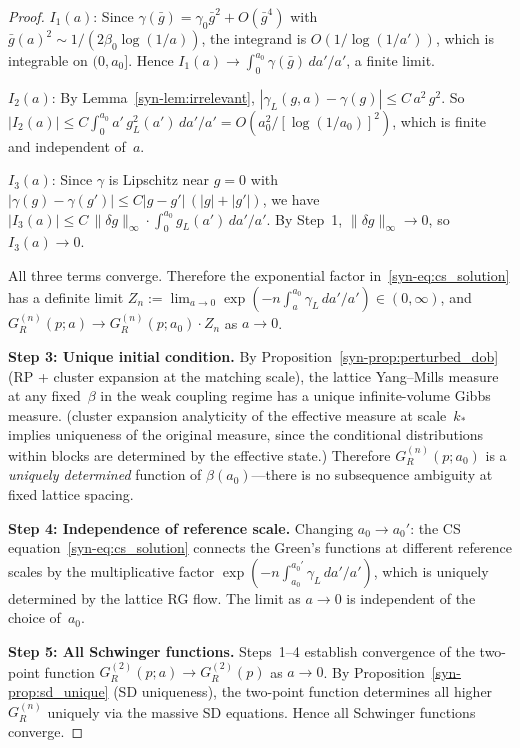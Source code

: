 \documentclass[11pt]{article}
\theoremstyle{definition}
\begin{document}
\begin{proof}
\noindent$I_1(a)$: Since
$\gamma(\bar{g}) = \gamma_0 \bar{g}^2 + O(\bar{g}^4)$
with $\bar{g}(a)^2 \sim 1/(2\beta_0\log(1/a))$,
the integrand is $O(1/\log(1/a'))$, which is integrable
on $(0, a_0]$.  Hence $I_1(a) \to
\int_0^{a_0} \gamma(\bar{g})\,da'/a'$, a finite limit.

\noindent$I_2(a)$: By Lemma~\ref{syn-lem:irrelevant},
$|\gamma_L(g,a) - \gamma(g)| \leq C\,a^2\,g^2$.
So $|I_2(a)| \leq C \int_0^{a_0}
a'\,g_L^2(a')\,da'/a' = O(a_0^2/[\log(1/a_0)]^2)$,
which is finite and independent of~$a$.

\noindent$I_3(a)$: Since $\gamma$ is Lipschitz near $g = 0$
with $|\gamma(g) - \gamma(g')| \leq C|g - g'|\,(|g| + |g'|)$,
we have $|I_3(a)| \leq C\,\|\delta g\|_\infty \cdot
\int_0^{a_0} g_L(a')\,da'/a'$.  By Step~1,
$\|\delta g\|_\infty \to 0$, so $I_3(a) \to 0$.

All three terms converge.  Therefore the exponential
factor in~\eqref{syn-eq:cs_solution} has a definite limit
$Z_n := \lim_{a \to 0} \exp(-n\int_a^{a_0}\gamma_L\,da'/a')
\in (0,\infty)$,
and $G_R^{(n)}(p; a) \to G_R^{(n)}(p; a_0) \cdot Z_n$
as $a \to 0$.

\smallskip
\textbf{Step 3: Unique initial condition.}
By Proposition~\ref{syn-prop:perturbed_dob} (RP + cluster expansion
at the matching scale), the lattice Yang--Mills
measure at any fixed~$\beta$ in the weak coupling regime
has a unique infinite-volume Gibbs measure.
(cluster expansion analyticity of the effective measure at
scale~$k_*$ implies uniqueness of the original
measure, since the conditional distributions within
blocks are determined by the effective state.)
Therefore $G_R^{(n)}(p; a_0)$ is a \emph{uniquely determined}
function of $\beta(a_0)$---there is no subsequence ambiguity
at fixed lattice spacing.

\smallskip
\textbf{Step 4: Independence of reference scale.}
Changing $a_0 \to a_0'$: the CS
equation~\eqref{syn-eq:cs_solution} connects the Green's
functions at different reference scales by the
multiplicative factor
$\exp(-n\int_{a_0}^{a_0'}\gamma_L\,da'/a')$, which is
uniquely determined by the lattice RG flow.
The limit as $a \to 0$ is
independent of the choice of~$a_0$.

\smallskip
\textbf{Step 5: All Schwinger functions.}
Steps~1--4 establish convergence of the two-point
function $G_R^{(2)}(p; a) \to G_R^{(2)}(p)$ as $a \to 0$.
By Proposition~\ref{syn-prop:sd_unique} (SD uniqueness),
the two-point function determines all higher
$G_R^{(n)}$ uniquely via the massive SD equations.
Hence all Schwinger functions converge.


\end{proof}
\end{document}

